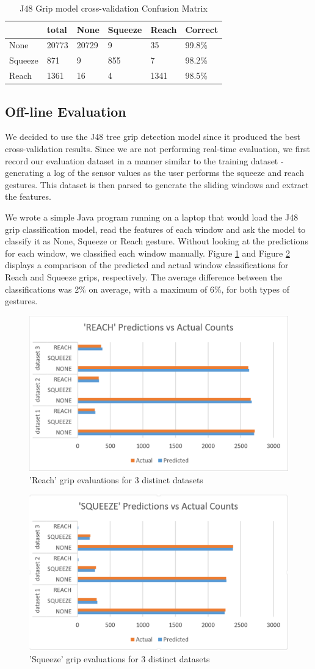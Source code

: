 \begin{table}[!t]
\caption{J48 Grip model cross-validation Confusion Matrix}
\label{tbl-Grip Model J48}
\begin{tabular}{|l||l|l|l|l|l|}
\hline
        & total & None  & Squeeze & Reach & Correct \\ \hline \hline
None    & 20773 & 20729 & 9       & 35    & 99.8\%  \\
Squeeze & 871   & 9     & 855     & 7     & 98.2\%  \\
Reach   & 1361  & 16    & 4       & 1341  & 98.5\%  \\ \hline
\end{tabular}
\end{table}


\subsection{Off-line Evaluation}
We decided to use the J48 tree grip detection model since it produced the best cross-validation results. Since we are not performing real-time evaluation, we first record our evaluation dataset in a manner similar to the training dataset - generating a log of the sensor values as the user performs the squeeze and reach gestures. This dataset is then parsed to generate the sliding windows and extract the features.
\par
We wrote a simple Java program running on a laptop that would load the J48 grip classification model, read the features of each window and ask the model to classify it as None, Squeeze or Reach gesture. Without looking at the predictions for each window, we classified each window manually. Figure \ref{fig:reach_eval} and Figure \ref{fig:squeeze_eval} displays a comparison of the predicted and actual window classifications for Reach and Squeeze grips, respectively. The average difference between the classifications was 2\% on average, with a maximum of 6\%, for both types of gestures.


\begin{figure}[h]
\includegraphics[width=.45\textwidth]{reach_eval.png}
\caption{'Reach' grip evaluations for 3 distinct datasets}
\label{fig:reach_eval}
\end{figure}


\begin{figure}[h]
\includegraphics[width=.45\textwidth]{squeeze_eval.png}
\caption{'Squeeze' grip evaluations for 3 distinct datasets}
\label{fig:squeeze_eval}
\end{figure}

